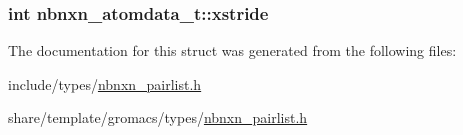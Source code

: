 \hypertarget{structnbnxn__atomdata__t_a5634643d3ae35f871a7ed3ba15cd9132}{
\subsubsection[{xstride}]{\setlength{\rightskip}{0pt plus 5cm}int {\bf nbnxn\-\_\-atomdata\-\_\-t\-::xstride}}}\label{structnbnxn__atomdata__t_a5634643d3ae35f871a7ed3ba15cd9132}


\-The documentation for this struct was generated from the following files\-:\begin{DoxyCompactItemize}
\item 
include/types/\hyperlink{include_2types_2nbnxn__pairlist_8h}{nbnxn\-\_\-pairlist.\-h}\item 
share/template/gromacs/types/\hyperlink{share_2template_2gromacs_2types_2nbnxn__pairlist_8h}{nbnxn\-\_\-pairlist.\-h}\end{DoxyCompactItemize}
